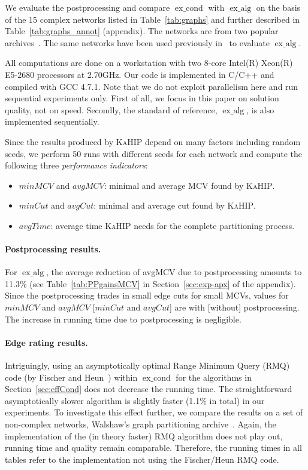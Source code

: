 \documentclass[pdftex]{llncs}
\newcommand{\excond}{\operatorname{ex\_cond}}
\newcommand{\exalg}{\operatorname{ex\_alg}}
\newcommand{\kahip}{\textsc{KaHIP}\xspace}
\numberwithin{equation}{section}
\numberwithin{example}{section}
\numberwithin{table}{section}
\begin{document}
We evaluate the postprocessing and compare $\excond$ with $\exalg$ on
the basis of the 15 complex networks listed in Table~\ref{tab:graphs}
and further described in Table~\ref{tab:graphs_annot} 
(appendix). The networks are from two
popular archives~\cite{BaderMSW12dimacs,Leskovecxxxx}. The same
networks have been used previously in~\cite{Safro2012a} to evaluate
$\exalg$.


All computations are done on a workstation with two 8-core Intel(R)
Xeon(R) E5-2680 processors at 2.70GHz. Our code is implemented in
C/C++ and compiled with GCC 4.7.1.  Note that we do not exploit
parallelism here and run sequential experiments only.  First of all,
we focus in this paper on solution quality, not on speed. Secondly,
the standard of reference, $\exalg$, is also implemented sequentially.

Since the results produced by \kahip depend on many factors including random seeds,
we perform 50 runs with different seeds for each network and compute the following three {\em performance
  indicators}:

\begin{itemize}[noitemsep,nolistsep]
\item $minMCV$ and $avgMCV$: minimal and average MCV found by \kahip. 
\item $minCut$ and $avgCut$: minimal and average cut found by \kahip. 
\item $avgTime$: average time \kahip needs for the complete partitioning process.
\end{itemize}




\paragraph{Postprocessing results.}
For $\exalg$, the average reduction of avgMCV due to
postprocessing amounts to 11.3\% (see Table~\ref{tab:PPgainsMCV} in
Section~\ref{sec:exp-apx} of the appendix). Since the postprocessing
trades in small edge cuts for small MCVs, values for $minMCV$ and
$avgMCV$ [$minCut$ and $avgCut$] are with [without]
postprocessing. The increase in running time due to postprocessing is
negligible.
\vspace{-1.75ex}
\paragraph{Edge rating results.}
Intriguingly, using an asymptotically optimal Range Minimum Query
(RMQ) code (by Fischer and Heun~\cite{Fischer2006a}) within $\excond$
for the algorithms in Section~\ref{sec:effCond} 
does not decrease the running time. The straightforward asymptotically
slower algorithm is slightly faster (1.1\% in total) in our
experiments. To investigate this effect further, we compare the results on a set of 
non-complex networks, Walshaw's graph partitioning
archive~\cite{SoperWC04combined}. Again, the implementation of the (in
theory faster) RMQ algorithm does not play out, running time and
quality remain comparable. Therefore, the running times in all tables
refer to the implementation not using the Fischer/Heun RMQ code.
\end{document}
